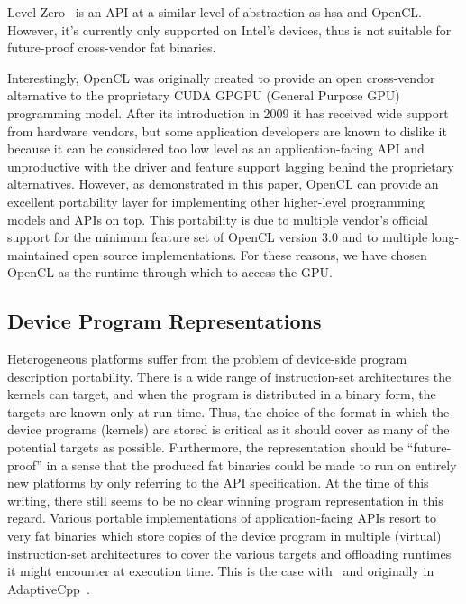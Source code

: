 \documentclass[Afour,sageh,times]{sagej}
\newcommand{\mycite}[1]{\citep{#1}}
\begin{document}
Level Zero~\mycite{l0} is an API at a similar level of abstraction as \gls{hsa} and OpenCL.
However, it's currently only supported on Intel's devices, thus is not suitable for future-proof cross-vendor fat binaries.

Interestingly, OpenCL was originally created to provide an open cross-vendor alternative to the proprietary CUDA GPGPU (General Purpose GPU) programming model. After its introduction in 2009 it has received wide support from hardware vendors, but some application developers are known to dislike it because it can be considered too low level as an application-facing API and unproductive with the driver and feature support lagging behind the proprietary alternatives.
However, as demonstrated in this paper, OpenCL can provide an excellent portability layer for implementing other higher-level programming models and APIs on top. This portability is due to multiple vendor's official support for the minimum feature set of OpenCL version 3.0 and to multiple long-maintained open source implementations. For these reasons, we have chosen OpenCL as the runtime through which to access the GPU.

\subsection{Device Program Representations}
\label{subsec:deviceProgramRepresentations}

Heterogeneous platforms suffer from the problem of device-side program description portability. There is a wide range of instruction-set architectures the kernels can target, and when the program is distributed in a binary form, the targets are known only at run time.
Thus, the choice of the format in which the device programs (kernels) are stored is critical as it should cover as many of the potential targets as possible.
Furthermore, the representation should be ``future-proof'' in a sense that the produced fat binaries could be made to run on entirely new platforms by only referring to the API specification.
At the time of this writing, there still seems to be no clear winning program representation in this regard. Various portable implementations of application-facing APIs resort to very fat binaries which store copies of the device program in multiple (virtual) instruction-set architectures to cover the various targets and offloading runtimes it might encounter at execution time. This is the case with~\mycite{10.1145/3559009.3569687} and originally in AdaptiveCpp~\mycite{10.1145/3529538.3530005}.
\end{document}
